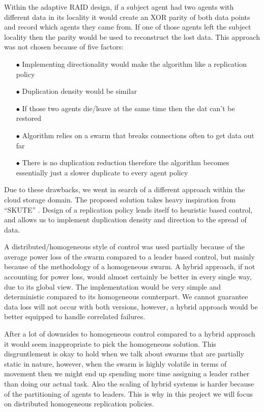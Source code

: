\documentclass{UoYCSproject}
\begin{document}
Within the adaptive RAID design, if a subject agent had two agents with different data in its locality it would create an XOR parity of both data points and record which agents they came from. If one of those agents left the subject locality then the parity would be used to reconstruct the lost data. This approach was not chosen because of five factors:

\begin{itemize} 
\itemsep-1em 
\item[$\bullet$] Implementing directionality would make the algorithm like a replication policy
\item[$\bullet$] Duplication density would be similar
\item[$\bullet$] If those two agents die/leave at the same time then the dat can’t be restored
\item[$\bullet$] Algorithm relies on a swarm that breaks connections often to get data out far
\item[$\bullet$] There is no duplication reduction therefore the algorithm becomes essentially just a slower duplicate to every agent policy
\end{itemize}

Due to these drawbacks, we went in search of a different approach within the cloud storage domain. The proposed solution takes heavy inspiration from “SKUTE” \cite{Distributed Storage}. Design of a replication policy lends itself to heuristic based control, and allows us to implement duplication density and direction to the spread of data.

A distributed/homogeneous style of control was used partially because of the average power loss of the swarm compared to a leader based control, but mainly because of the methodology of a homogeneous swarm. A hybrid approach, if not accounting for power loss, would almost certainly be better in every single way, due to its global view. The implementation would be very simple and deterministic compared to its homogeneous counterpart. We cannot guarantee data loss will not occur with both versions, however, a hybrid approach would be better equipped to handle correlated failures.

After a lot of downsides to homogeneous control compared to a hybrid approach it would seem inappropriate to pick the homogeneous solution. This disgruntlement is okay to hold when we talk about swarms that are partially static in nature, however, when the swarm is highly volatile in terms of movement then we might end up spending more time assigning a leader rather than doing our actual task. Also the scaling of hybrid systems is harder because of the partitioning of agents to leaders. This is why in this project we will focus on distributed homogeneous replication policies.
\end{document}
